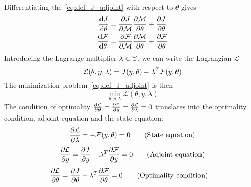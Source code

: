 \documentclass[../../Main_ManuscritThese.tex]{subfiles}
\begin{document}
Differentiating the~\cref{eq:def_J_adjoint} with respect to $\theta$ gives
\begin{equation}
  \begin{aligned}
  \frac{\mathrm{d}J}{\mathrm{d}\theta} &= \frac{\partial J}{\partial \mathcal{M}} \frac{\partial \mathcal{M}}{\partial \theta} + \frac{\partial J}{\partial \theta}\\
    \frac{\mathrm{d}\mathcal{F}}{\mathrm{d}\theta} &= \frac{\partial \mathcal{F}}{\partial \mathcal{M}} \frac{\partial \mathcal{M}}{\partial \theta} + \frac{\partial \mathcal{F}}{\partial \theta}
  \end{aligned} \label{eq:aze}
\end{equation}
Introducing the Lagrange multiplier  $\lambda \in \mathbb{Y}$, we can write the Lagrangian $\mathcal{L}$
\begin{equation}
  \mathcal{L}(\theta, y, \lambda) = J(y,\theta) - \lambda^T \mathcal{F}(y, \theta)
\end{equation}
The minimization problem~\cref{eq:def_J_adjoint} is then
\begin{equation}
  \min_{\theta,y,\lambda} \mathcal{L}(\theta,y,\lambda)
\end{equation}
The condition of optimality $\frac{\partial \mathcal{L}}{\partial \theta} = \frac{\partial \mathcal{L}}{\partial y} = \frac{\partial \mathcal{L}}{\partial \lambda} = 0$ translates into the optimality condition, adjoint equation and the state equation:
\begin{equation}
  \frac{\partial \mathcal{L}}{\partial \lambda} = - \mathcal{F}(y,\theta) = 0 \tag{State equation}
\end{equation}
\begin{equation}
  \frac{\partial \mathcal{L}}{\partial y} = \frac{\partial J}{\partial y} - \lambda^T \frac{\partial \mathcal{F}}{\partial y}= 0  \tag{Adjoint equation} 
\end{equation}
\begin{align}
    \pfrac{\mathcal{L}}{\theta}%
                               &= \pfrac{J}{\theta} - \innerprod{\lambda}{\pfrac{\mathcal{F}}{\theta}} = 0 \tag{Optimality condition}
\end{align}
\end{document}

